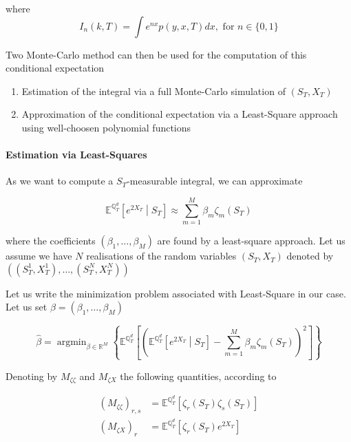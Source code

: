 \documentclass{article}
\DeclareMathOperator*{\argmin}{argmin}
\begin{document}
\noindent where
\begin{equation}
	\label{eq:Inintegral}
	I_n(k,T) = \int e^{nx} p(y,x,T) dx, \text{ for } n \in \{0,1\}
\end{equation}

\noindent Two Monte-Carlo method can then be used for the computation of this conditional expectation

\begin{enumerate}
	\item Estimation of the integral via a full Monte-Carlo simulation of $(S_T,X_T)$
	\item Approximation of the conditional expectation via a Least-Square approach using well-choosen polynomial functions
\end{enumerate}

\paragraph{Estimation via Least-Squares}
As we want to compute a $S_T$-measurable integral, we can approximate

\begin{equation}
	\mathbb{E}^{\mathbb{Q}_T^d}\left[e^{2X_T}\middle| S_T \right] \approx \sum_{m=1}^{M} \beta_m \zeta_m\left(S_T\right)
\end{equation}

\noindent where the coefficients $(\beta_1, \dots, \beta_M)$ are found by a least-square approach. Let us assume we have $N$ realisations of the random variables $(S_T,X_T)$ denoted by $\left((S_T^1,X_T^1),\dots, (S_T^N,X_T^N)\right)$

\noindent Let us write the minimization problem associated with Least-Square in our case. Let us set $\beta = \left(\beta_1, \dots, \beta_M\right)$

\begin{equation}
	\hat{\beta} = \argmin_{\beta \in \mathbb{R}^M}
\left\{\mathbb{E}^{\mathbb{Q}_T^d}\left[\left(\mathbb{E}^{\mathbb{Q}_T^d}\left[e^{2X_T} \middle| S_T\right] - \sum_{m=1}^M \beta_m \zeta_m\left(S_T\right)\right)^2\right]\right\}
\end{equation}

\noindent Denoting by $M_{\zeta \zeta}$ and $M_{\zeta X}$ the following quantities, according to \cite{Humeau2013}

\begin{equation}
\begin{aligned}
	(M_{\zeta \zeta})_{r,s} &= \mathbb{E}^{\mathbb{Q}_T^d}\left[\zeta_r(S_T)\zeta_s(S_T)\right]\\
	(M_{\zeta X})_r &= \mathbb{E}^{\mathbb{Q}_T^d}\left[\zeta_r(S_T)e^{2X_T}\right]
\end{aligned}
\end{equation}
\end{document}
